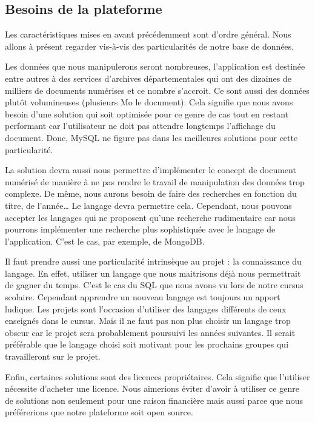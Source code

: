     \subsection{Besoins de la plateforme}
    \label{subsec:besoinplateforme}
    Les caractéristiques mises en avant précédemment sont d’ordre général. Nous allons à présent regarder
    vis-à-vis des particularités de notre base de données.

    Les données que nous manipulerons seront nombreuses, l’application est destinée entre autres
    à des services d’archives départementales qui ont des dizaines de milliers de documents numérises
    et ce nombre s’accroit. Ce sont aussi des données plutôt volumineuses (plusieurs Mo le document).
    Cela signifie que nous avons besoin d’une solution qui soit optimisée pour ce genre de cas tout
    en restant performant car l’utilisateur ne doit pas attendre longtemps l’affichage du document.
    Donc, MySQL ne figure pas dans les meilleures solutions pour cette particularité.

    La solution devra aussi nous permettre d’implémenter le concept de document numérisé de manière
    à ne pas rendre le travail de manipulation des données trop complexe. De même, nous aurons besoin
    de faire des recherches en fonction du titre, de l’année… Le langage devra permettre cela. Cependant,
    nous pouvons accepter les langages qui ne proposent qu’une recherche rudimentaire car nous pourrons
    implémenter une recherche plus sophistiquée avec le langage de l’application. C’est le cas, par exemple,
    de MongoDB.

    Il faut prendre aussi une particularité intrinsèque au projet : la connaissance du langage. En effet,
    utiliser un langage que nous maitrisons déjà nous permettrait de gagner du temps. C’est le cas du SQL
    que nous avons vu lors de notre cursus scolaire. Cependant apprendre un nouveau langage est toujours
    un apport ludique. Les projets sont l’occasion d’utiliser des langages différents de ceux enseignés
    dans le cursus. Mais il ne faut pas non plus choisir un langage trop obscur car le projet sera
    probablement poursuivi les années suivantes. Il serait préférable que le langage choisi soit motivant
    pour les prochains groupes qui travailleront sur le projet.

    Enfin, certaines solutions sont des licences propriétaires. Cela signifie que l’utiliser nécessite
    d’acheter une licence. Nous aimerions éviter d’avoir à utiliser ce genre de solutions non seulement
    pour une raison financière mais aussi parce que nous préférerions  que notre plateforme soit open source.

